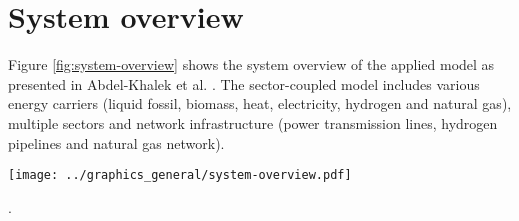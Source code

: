 

\section{System overview}
\label{sec:system-overview}

Figure \ref{fig:system-overview} shows the system overview of the applied model as presented in Abdel-Khalek et al. \cite{Abdel-Khalek2024}. The sector-coupled model includes various energy carriers (liquid fossil, biomass, heat, electricity, hydrogen and natural gas), multiple sectors and network infrastructure (power transmission lines, hydrogen pipelines and natural gas network)\cite{Abdel-Khalek2024}.

\begin{figure*}[h]
    \centering
    \texttt{[image: ../graphics\_general/system-overview.pdf]}
    \caption{System overview of the sector-coupled model, including various energy carriers (liquid fossil, biomass, heat, electricity, hydrogen and natural gas), multiple sectors and network infrastructure (power transmission lines, hydrogen pipelines and natural gas network)\cite{Abdel-Khalek2024}}.
    \label{fig:system-overview}
\end{figure*}

\clearpage

